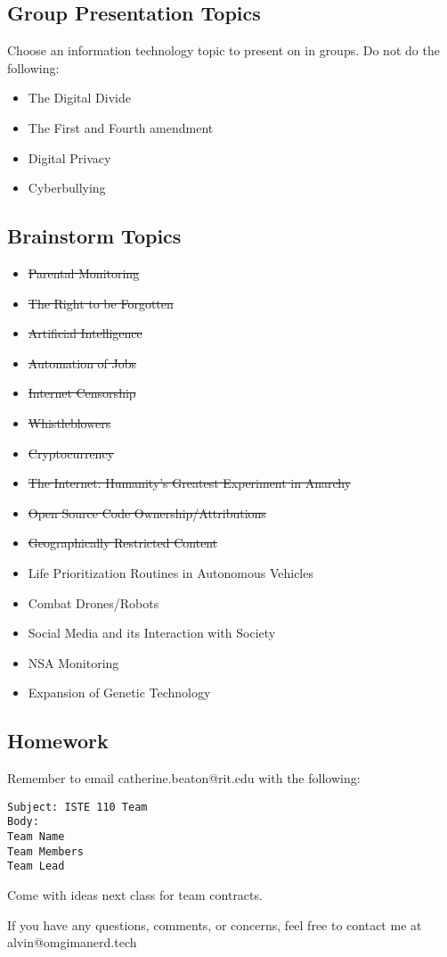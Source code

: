 \documentclass[letterpaper, 12pt]{article}
\begin{document}
\subsection*{Group Presentation Topics}
Choose an information technology topic to present on in groups. Do not do the
following:
\begin{itemize}
  \item The Digital Divide
  \item The First and Fourth amendment
  \item Digital Privacy
  \item Cyberbullying
\end{itemize}

\subsection*{Brainstorm Topics}
\begin{itemize}
  \item \sout{Parental Monitoring}
  \item \sout{The Right to be Forgotten}
  \item \sout{Artificial Intelligence}
  \item \sout{Automation of Jobs}
  \item \sout{Internet Censorship}
  \item \sout{Whistleblowers}
  \item \sout{Cryptocurrency}
  \item \sout{The Internet: Humanity's Greatest Experiment in Anarchy}
  \item \sout{Open Source Code Ownership/Attributions}
  \item \sout{Geographically Restricted Content}
  \item Life Prioritization Routines in Autonomous Vehicles
  \item Combat Drones/Robots
  \item Social Media and its Interaction with Society
  \item NSA Monitoring
  \item Expansion of Genetic Technology
\end{itemize}

\subsection*{Homework}
Remember to email catherine.beaton@rit.edu with the following:
\begin{verbatim}
Subject: ISTE 110 Team
Body:
Team Name
Team Members
Team Lead
\end{verbatim}
Come with ideas next class for team contracts.

\begin{center}
  If you have any questions, comments, or concerns, feel free to contact me
  at alvin@omgimanerd.tech
\end{center}
\end{document}
